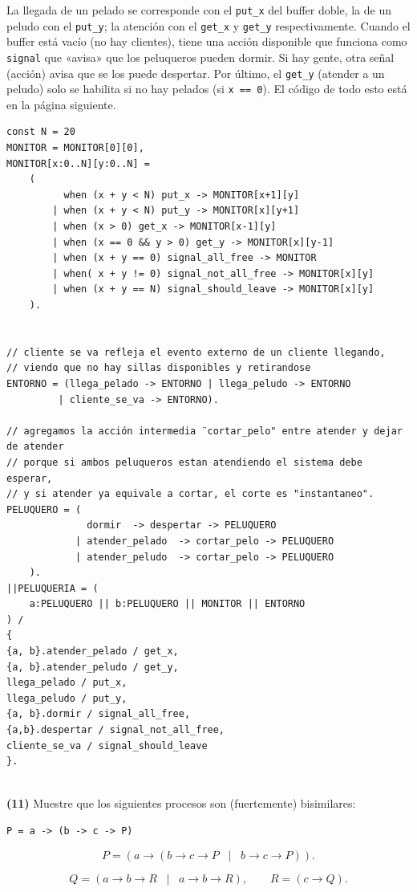 \documentclass[a4paper, 12pt]{article}
\begin{document}
La llegada de un pelado se corresponde con el \texttt{put\_x} del buffer doble,
la de un peludo con el \texttt{put\_y}; la atención con el \texttt{get\_x} y
\texttt{get\_y} respectivamente. Cuando el buffer está vacío (no hay clientes),
tiene una acción disponible que funciona como \texttt{signal} que «avisa» que
los peluqueros pueden dormir. Si hay gente, otra señal (acción) avisa que se los
puede despertar. Por último, el \texttt{get\_y} (atender a un peludo) solo se
habilita si no hay pelados (si \texttt{x == 0}). El código de todo esto está en
la página siguiente.

\pagebreak
\begin{verbatim}
const N = 20
MONITOR = MONITOR[0][0],
MONITOR[x:0..N][y:0..N] = 
	(
		  when (x + y < N) put_x -> MONITOR[x+1][y]
		| when (x + y < N) put_y -> MONITOR[x][y+1]
		| when (x > 0) get_x -> MONITOR[x-1][y]
		| when (x == 0 && y > 0) get_y -> MONITOR[x][y-1] 
		| when (x + y == 0) signal_all_free -> MONITOR
		| when( x + y != 0) signal_not_all_free -> MONITOR[x][y]
		| when (x + y == N) signal_should_leave -> MONITOR[x][y]
	).


// cliente se va refleja el evento externo de un cliente llegando,
// viendo que no hay sillas disponibles y retirandose
ENTORNO = (llega_pelado -> ENTORNO | llega_peludo -> ENTORNO 
		 | cliente_se_va -> ENTORNO).

// agregamos la acción intermedia ¨cortar_pelo" entre atender y dejar de atender
// porque si ambos peluqueros estan atendiendo el sistema debe esperar,
// y si atender ya equivale a cortar, el corte es "instantaneo".
PELUQUERO = (
	  		  dormir  -> despertar -> PELUQUERO
			| atender_pelado  -> cortar_pelo -> PELUQUERO  
			| atender_peludo  -> cortar_pelo -> PELUQUERO
	).
||PELUQUERIA = (
	a:PELUQUERO || b:PELUQUERO || MONITOR || ENTORNO
) / 
{
{a, b}.atender_pelado / get_x,
{a, b}.atender_peludo / get_y,
llega_pelado / put_x,
llega_peludo / put_y,
{a, b}.dormir / signal_all_free,
{a,b}.despertar / signal_not_all_free,
cliente_se_va / signal_should_leave
}.


\end{verbatim}













\pagebreak 

\begin{myframe}
    \textbf{(11)} Muestre que los siguientes procesos son (fuertemente) bisimilares:

\begin{verbatim}
P = a -> (b -> c -> P)    
\end{verbatim}

\[
P = \left( a \to \left( b \to c \to P \;\; \mid \;\; b \to c \to P \right) \right).
\]

\[
Q = \left( a \to b \to R \;\; \mid \;\; a \to b \to R \right),
\qquad
R = \left( c \to Q \right).
\]
\end{myframe}
\end{document}
